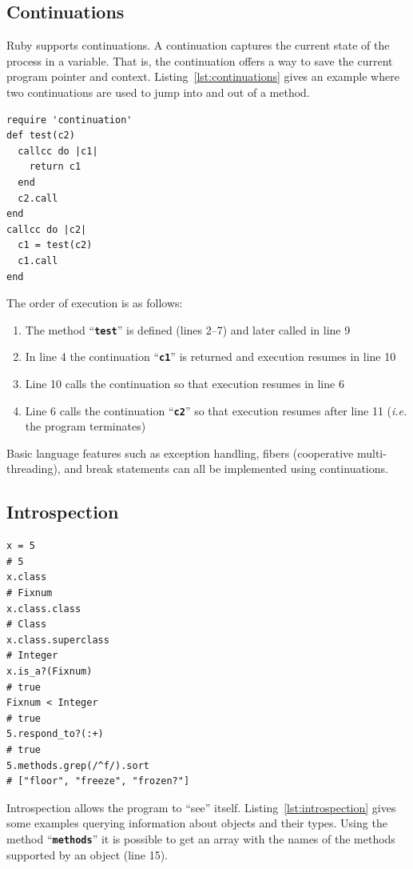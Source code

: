 \documentclass[12pt,a4paper,oneside,openright]{book}
\newcommand{\ie}{\emph{i.e.} }
\newcommand{\Ie}{That is, }
\newcommand{\lst}[1]{Listing~\ref{lst:#1}}
\newcommand{\code}[1]{``\texttt{\textbf{\textcolor{codegray}{\small{#1}}}}''}
\begin{document}
\begin{CJK}{UTF8}{}
\subsection{Continuations}
Ruby supports continuations. A continuation captures the current state of the process in a variable. \Ie the continuation offers a way to save the current program pointer and context. \lst{continuations} gives an example where two continuations are used to jump into and out of a method.
\lstset{language=Ruby,frame=single,numbers=left}
\begin{lstlisting}[float=htbp,caption={Continuations in Ruby},label=lst:continuations]
require 'continuation'
def test(c2)
  callcc do |c1|
    return c1
  end
  c2.call
end
callcc do |c2|
  c1 = test(c2)
  c1.call
end
\end{lstlisting}
The order of execution is as follows:
\begin{enumerate}
\item The method \code{test} is defined (lines 2--7) and later called in line 9
\item In line 4 the continuation \code{c1} is returned and execution resumes in line 10
\item Line 10 calls the continuation so that execution resumes in line 6
\item Line 6 calls the continuation \code{c2} so that execution resumes after line 11 (\ie the program terminates)
\end{enumerate}

Basic language features such as exception handling, fibers (cooperative mul\-ti-thread\-ing), and break statements can all be implemented using continuations.

\subsection{Introspection}
\lstset{language=Ruby,frame=single,numbers=left}
\begin{lstlisting}[float=htbp,caption={Introspection in Ruby},label=lst:introspection]
x = 5                       
# 5
x.class                     
# Fixnum
x.class.class               
# Class
x.class.superclass          
# Integer
x.is_a?(Fixnum)             
# true
Fixnum < Integer            
# true
5.respond_to?(:+)           
# true
5.methods.grep(/^f/).sort   
# ["floor", "freeze", "frozen?"]
\end{lstlisting}
Introspection allows the program to ``see'' itself. \lst{introspection} gives some examples querying information about objects and their types. Using the method \code{methods} it is possible to get an array with the names of the methods supported by an object (line 15).


\end{CJK}
\end{document}
